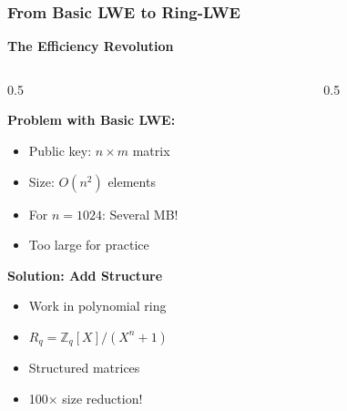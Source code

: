 \documentclass[aspectratio=169,10pt]{beamer}
\newcommand{\slideheader}[1]{\frametitle{#1}}
\theoremstyle{plain}
\begin{document}
\begin{frame}
  \slideheader{From Basic LWE to Ring-LWE}
  
  \begin{center}
    \textbf{\large The Efficiency Revolution}
  \end{center}
  
  \vspace{0.3cm}
  
  \begin{columns}[T]
    \begin{column}{0.5\textwidth}

    \begin{redBox}
      \textbf{Problem with Basic LWE:}
      \begin{itemize}
        \item Public key: $n \times m$ matrix
        \item Size: $O(n^2)$ elements
        \item For $n=1024$: Several MB!
        \item Too large for practice
      \end{itemize}
    \end{redBox}
    
    \vspace{0.3cm}
    
    \begin{greenBox}
      \textbf{Solution: Add Structure}
      \begin{itemize}
        \item Work in polynomial ring
        \item $R_q = \mathbb{Z}_q[X]/(X^n + 1)$
        \item Structured matrices
        \item 100× size reduction!
      \end{itemize}
    \end{greenBox}
  
    \end{column}
    \begin{column}{0.5\textwidth}

\end{column}
\end{columns}
\end{frame}
\end{document}

